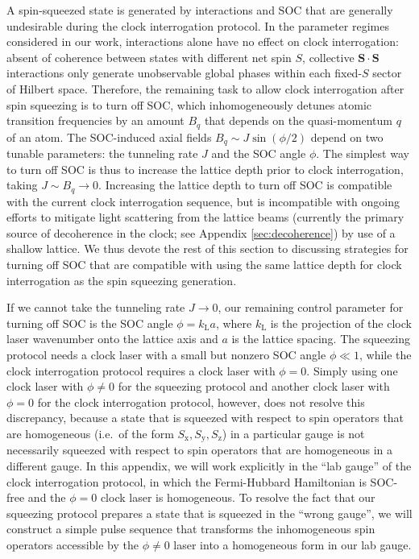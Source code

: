 \documentclass[aps,prx,superscriptaddress,notitlepage,twocolumn,longbibliography]{revtex4-1}
\renewcommand{\t}{\text} %
\renewcommand{\c}{\cdot} %
\renewcommand{\v}{\bm} %
\newcommand{\z}{\text{z}}
\newcommand{\x}{\text{x}}
\newcommand{\y}{\text{y}}
\begin{document}
A spin-squeezed state is generated by interactions and SOC that are generally undesirable during the clock interrogation protocol.
In the parameter regimes considered in our work, interactions alone have no effect on clock interrogation: absent of coherence between states with different net spin $S$, collective $\v S\c\v S$ interactions only generate unobservable global phases within each fixed-$S$ sector of Hilbert space.
Therefore, the remaining task to allow clock interrogation after spin squeezing is to turn off SOC, which inhomogeneously detunes atomic transition frequencies by an amount $B_q$ that depends on the quasi-momentum $q$ of an atom.
The SOC-induced axial fields $B_q\sim J\sin(\phi/2)$ depend on two tunable parameters: the tunneling rate $J$ and the SOC angle $\phi$.
The simplest way to turn off SOC is thus to increase the lattice depth prior to clock interrogation, taking $J\sim B_q\to0$.
Increasing the lattice depth to turn off SOC is compatible with the current clock interrogation sequence, but is incompatible with ongoing efforts to mitigate light scattering from the lattice beams (currently the primary source of decoherence in the clock; see Appendix \ref{sec:decoherence}) by use of a shallow lattice\cite{hutson2019engineering}.
We thus devote the rest of this section to discussing strategies for turning off SOC that are compatible with using the same lattice depth for clock interrogation as the spin squeezing generation.

If we cannot take the tunneling rate $J\to0$, our remaining control parameter for turning off SOC is the SOC angle $\phi=k_{\t{L}}a$, where $k_{\t{L}}$ is the projection of the clock laser wavenumber onto the lattice axis and $a$ is the lattice spacing.
The squeezing protocol needs a clock laser with a small but nonzero SOC angle $\phi\ll1$, while the clock interrogation protocol requires a clock laser with $\phi=0$.
Simply using one clock laser with $\phi\ne0$ for the squeezing protocol and another clock laser with $\phi=0$ for the clock interrogation protocol, however, does not resolve this discrepancy, because 
a state that is squeezed with respect to spin operators that are homogeneous (i.e.~of the form $S_\x,S_\y,S_\z$) in a particular gauge is not necessarily squeezed with respect to spin operators that are homogeneous in a different gauge.
In this appendix, we will work explicitly in the ``lab gauge'' of the clock interrogation protocol, in which the Fermi-Hubbard Hamiltonian is SOC-free and the $\phi=0$ clock laser is homogeneous. To resolve the fact that our squeezing protocol prepares a state that is squeezed in the ``wrong gauge'', we will construct a simple pulse sequence that transforms the inhomogeneous spin operators accessible by the $\phi\ne0$ laser into a homogeneous form in our lab gauge.
\end{document}
